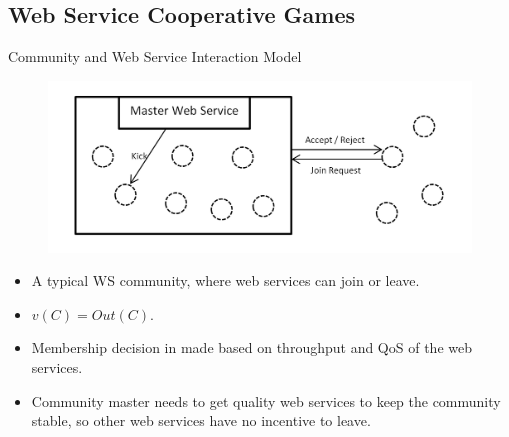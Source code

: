 \documentclass{beamer}
\begin{document}
\subsection{Web Service Cooperative Games}

\begin{frame}{Community and Web Service Interaction Model}
    \begin{figure}[htbp]
        \centering
        \includegraphics[width=0.8 \columnwidth]{figures/scenario1.png}
    \end{figure}

    \begin{itemize}
        \item A typical WS community, where web services can join or leave.
        \item $v(C) = Out(C)$.
        \item Membership decision in made based on throughput and QoS of the web services.
        \item Community master needs to get quality web services to keep the community stable, so other web services have no incentive to leave.
    \end{itemize}
       	
\end{frame}
\end{document}
